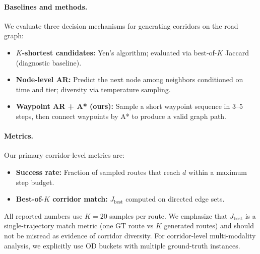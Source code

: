 \paragraph{Baselines and methods.}
We evaluate three decision mechanisms for generating corridors on the road graph:
\begin{itemize}
  \item \textbf{$K$-shortest candidates:} Yen's algorithm; evaluated via best-of-$K$ Jaccard (diagnostic baseline).
  \item \textbf{Node-level AR:} Predict the next node among neighbors conditioned on time and tier; diversity via temperature sampling.
  \item \textbf{Waypoint AR + A* (ours):} Sample a short waypoint sequence in 3--5 steps, then connect waypoints by A* to produce a valid graph path.
\end{itemize}

\paragraph{Metrics.}
Our primary corridor-level metrics are:
\begin{itemize}
  \item \textbf{Success rate:} Fraction of sampled routes that reach $d$ within a maximum step budget.
  \item \textbf{Best-of-$K$ corridor match:} $J_{\mathrm{best}}$ computed on directed edge sets.
\end{itemize}
All reported numbers use $K=20$ samples per route.
We emphasize that $J_{\mathrm{best}}$ is a single-trajectory match metric (one GT route vs $K$ generated routes) and should not be misread as evidence of corridor diversity.
For corridor-level multi-modality analysis, we explicitly use OD buckets with multiple ground-truth instances.
